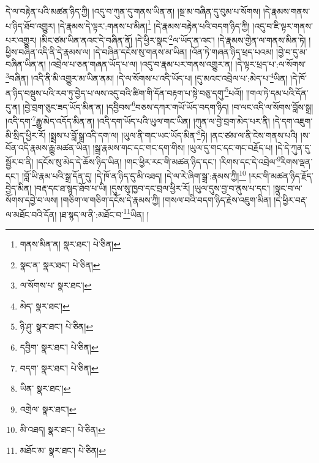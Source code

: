 དེ་ལ་བརྟེན་པའི་མཚན་ཉིད་ཀྱི། །འདུ་བ་ཀུན་དུ་གནས་ཡིན་ན། །སྔ་མ་བཞིན་དུ་བུམ་པ་སོགས། །དེ་རྣམས་གནས་པ་ཉིད་ཐོབ་འགྱུར། །དེ་རྣམས་དེ་ལྟར་:གནས་པ་མིན།\footnote{གནས་མིན་ན།  སྣར་ཐང་།  པེ་ཅིན། } །དེ་རྣམས་བརྟེན་པའི་བདག་ཉིད་ཀྱི། །འདུ་བ་ཇི་ལྟར་གནས་པར་འགྱུར། །མིང་ཙམ་ཡིན་ནའང་དེ་བཞིན་ནོ། །དེ་ཕྱིར་སྣང་\footnote{སྣང་ན་  སྣར་ཐང་།  པེ་ཅིན། }ལ་ཡོད་ན་འང་། །དེ་རྣམས་གྱེན་ལ་གནས་མིན་ཏེ། །ཕྱིས་བཞིན་འདི་ནི་དེ་རྣམས་ལ། །དེ་བཞིན་དངོས་སུ་གནས་མ་ཡིན། །འོན་ཏེ་གཞན་ཉིད་ཕྲད་པའམ། །བྱེ་བ་དུ་མ་བཞིན་ཡིན་ན། །འབྲེལ་པ་ཅན་གཞན་ཡོད་པ་ལ། །འདུ་བ་རྣམ་པར་གནས་འགྱུར་ན། །དེ་ལྟར་ཕྲད་པ་:ལ་སོགས་\footnote{ལ་སོགས་པ་  སྣར་ཐང་། }བཞིན། །འདི་ནི་མི་འགྱུར་མ་ཡིན་ནམ། །དེ་ལ་སོགས་པ་འདི་ཡོད་པ། །དུ་མའང་འབྲེལ་པ་:མེད་པ་\footnote{མེད་  སྣར་ཐང་། }ཡིན། །དེ་ཁོ་ན་ཉིད་བསྡུས་པའི་རབ་ཏུ་བྱེད་པ་ལས་འདུ་བའི་ཚིག་གི་དོན་བརྟག་པ་སྟེ་བཅུ་དགུ་\footnote{ཉི་ཤུ་  སྣར་ཐང་།  པེ་ཅིན། }པའོ།། །།གལ་ཏེ་དམ་པའི་དོན་དུ་ན། །བྱེ་བྲག་ཅུང་ཟད་ཡོད་མིན་ན། །དབྱིབས་\footnote{དབྱིག་  སྣར་ཐང་།  པེ་ཅིན། }བཅས་དཀར་གཡོ་ཡོད་བདག་ཉིད། །བ་ལང་འདི་ལ་སོགས་བློས་སྒྲ། །འདི་དག་\footnote{བདག་  སྣར་ཐང་།  པེ་ཅིན། }རྒྱུ་མེད་འདོད་མིན་ན། །འདི་དག་ཡོད་པའི་ཡུལ་གང་ཡིན། །ཀུན་ལ་བྱེ་བྲག་མེད་པར་ནི། །དེ་དག་འཇུག་མི་སྲིད་ཕྱིར་རོ། །སྨྲས་པ་བློ་སྒྲ་འདི་དག་ལ། །ཡུལ་ནི་གང་ཡང་ཡོད་མིན་\footnote{ཡིན་  སྣར་ཐང་། }ཏེ། །ནང་ཙམ་ལ་ནི་ངེས་གནས་པའི། །ས་བོན་འདི་རྣམས་རྒྱུ་མཚན་ཡིན། །སྒྲ་རྣམས་གང་དང་གང་དག་གིས། །ཡུལ་དུ་གང་དང་གང་བརྗོད་པ། །དེ་དེ་ཀུན་དུ་སྦྱོར་བ་ནི། །དངོས་སུ་མེད་དེ་ཆོས་ཉིད་ཡིན། །གང་ཕྱིར་རང་གི་མཚན་ཉིད་དང་། །རིགས་དང་དེ་འབྲེལ་\footnote{འགྲེལ་  སྣར་ཐང་། }རིགས་ལྡན་དང་། །བློ་ཡི་རྣམ་པའི་སྒྲ་དོན་དུ། །དེ་ཁོ་ན་ཉིད་དུ་མི་འཐད། །དེ་ལ་རེ་ཞིག་སྒྲ་:རྣམས་ཀྱི།\footnote{མི་འཐད།  སྣར་ཐང་།  པེ་ཅིན། } །རང་གི་མཚན་ཉིད་རྗོད་བྱེད་མིན། །བརྡ་དང་ཐ་སྙད་ཐོབ་པ་ཡི། །དུས་སུ་ཁྱབ་དང་བྲལ་ཕྱིར་རོ། །ཡུལ་དུས་བྱ་བ་ནུས་པ་དང་། །སྣང་བ་ལ་སོགས་དབྱེ་བ་ལས། །གཅིག་ལ་གཅིག་དངོས་དེ་རྣམས་ཀྱི། །གསལ་བའི་བདག་ཉིད་རྗེས་འཇུག་མིན། །དེ་ཕྱིར་བརྡ་ལ་མཐོང་བའི་དོན། །ཐ་སྙད་ལ་ནི་:མཐོང་བ་\footnote{མཐོང་མ་  སྣར་ཐང་།  པེ་ཅིན། }ཡིན། །
